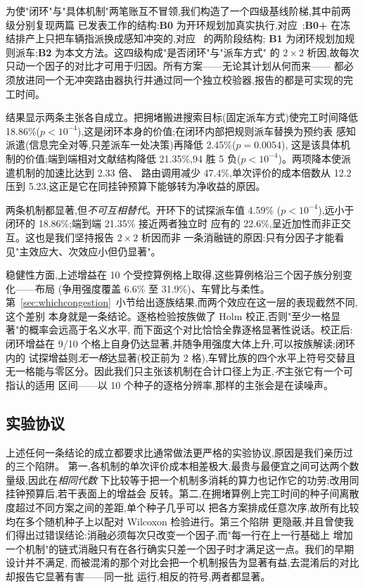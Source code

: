 \documentclass[manuscript,screen,review]{acmart}
\newcommand{\NCases}{10}
\newcommand{\NSeeds}{10}
\newcommand{\GainLoopRule}{18.86\%}      %
\newcommand{\PLoopRule}{<10^{-4}}
\newcommand{\GainProbeOpen}{4.59\%}      %
\newcommand{\PProbeOpen}{<10^{-4}}
\newcommand{\GainProbeLoop}{2.45\%}      %
\newcommand{\PProbeLoop}{=0.0054}
\newcommand{\GainEndToEnd}{21.35\%}      %
\newcommand{\PEndToEnd}{<10^{-4}}
\newcommand{\WinEndToEnd}{94}
\newcommand{\LoseEndToEnd}{5}
\newcommand{\GainIndepProduct}{22.6\%}
\newcommand{\CellsSigLoopAdj}{9}
\newcommand{\CellsSigProbe}{2}
\newcommand{\ContentionLo}{6.6\%}
\newcommand{\ContentionAHi}{31.9\%}
\newcommand{\SpeedupProbe}{2.33}
\newcommand{\RouteCallCut}{47.4\%}
\newcommand{\CostMultBefore}{12.2}
\newcommand{\CostMultAfter}{5.23}
\begin{document}
为使"闭环"与"具体机制"两笔账互不冒领,我们构造了一个四级基线阶梯,其中前两级分别复现两篇
已发表工作的结构:\textbf{B0} 为开环规划加真实执行,对应~\cite{li2026framework};\textbf{B0+}
在冻结排产上只把车辆指派换成感知冲突的,对应~\cite{sun2023integrated} 的两阶段结构;
\textbf{B1} 为闭环规划加规则派车;\textbf{B2} 为本文方法。这四级构成"是否闭环"与"派车方式"
的 $2\times2$ 析因,故每次只动一个因子的对比才可用于归因。所有方案——无论其计划从何而来——
都必须放进同一个无冲突路由器执行并通过同一个独立校验器,报告的都是可实现的完工时间。

结果显示两条主张各自成立。把拥堵搬进搜索目标(固定派车方式)使完工时间降低
\GainLoopRule{}($p\PLoopRule$),这是闭环本身的价值;在闭环内部把规则派车替换为预约表
感知派遣(信息完全对等,只差派车一处决策)再降低 \GainProbeLoop{}($p\PProbeLoop$),
这是该具体机制的价值;端到端相对文献结构降低 \GainEndToEnd{},\WinEndToEnd{} 胜
\LoseEndToEnd{} 负($p\PEndToEnd$)。两项降本使派遣机制的加速比达到 \SpeedupProbe{} 倍、
路由调用减少 \RouteCallCut{},单次评价的成本倍数从 \CostMultBefore{} 压到
\CostMultAfter{},这正是它在同挂钟预算下能够转为净收益的原因。

两条机制都显著,但\emph{不可互相替代}。开环下的试探派车值 \GainProbeOpen{}
($p\PProbeOpen$),远小于闭环的 \GainLoopRule{};端到端 \GainEndToEnd{} 接近两者独立时
应有的 \GainIndepProduct{},呈近加性而非正交互。这也是我们坚持报告 $2\times2$ 析因而非
一条消融链的原因:只有分因子才能看见"主效应大、次效应小但仍显著"。

稳健性方面,上述增益在 \NCases{} 个受控算例格上取得,这些算例格沿三个因子族分别变化——布局
(争用强度覆盖 \ContentionLo{} 至 \ContentionAHi{})、车臂比与柔性。
第~\ref{sec:whichcongestion}~小节给出逐族结果,而两个效应在这一层的表现截然不同,这个差别
本身就是一条结论。逐格检验按族做了 Holm 校正,否则"至少一格显著"的概率会远高于名义水平,
而下面这个对比恰恰全靠逐格显著性说话。校正后:闭环增益在
\CellsSigLoopAdj{}/\NCases{} 个格上自身仍达显著,并随争用强度大体上升,可以按族解读;闭环内的
试探增益则\emph{无一格}达显著(校正前为 \CellsSigProbe{} 格),车臂比族的四个水平上符号交替且
无一格能与零区分。因此我们只主张该机制在合计口径上为正,\emph{不}主张它有一个可指认的适用
区间——以 \NSeeds{} 个种子的逐格分辨率,那样的主张会是在读噪声。

\subsection{实验协议}

上述任何一条结论的成立都要求比通常做法更严格的实验协议,原因是我们亲历过的三个陷阱。
第一,各机制的单次评价成本相差极大,最贵与最便宜之间可达两个数量级,因此在\emph{相同代数}
下比较等于把一个机制多消耗的算力也记作它的功劳;改用同挂钟预算后,若干表面上的增益会
反转。第二,在拥堵算例上完工时间的种子间离散度超过不同方案之间的差距,单个种子几乎可以
把各方案排成任意次序,故所有比较均在多个随机种子上以配对 Wilcoxon 检验进行。第三个陷阱
更隐蔽,并且曾使我们得出过错误结论:消融必须每次只改变一个因子,而"每一行在上一行基础上
增加一个机制"的链式消融只有在各行确实只差一个因子时才满足这一点。我们的早期设计并不满足,
而被混淆的那个对比会把一个机制报告为显著有益,去混淆后的对比却报告它显著有害——同一批
运行,相反的符号,两者都显著。
\end{document}
